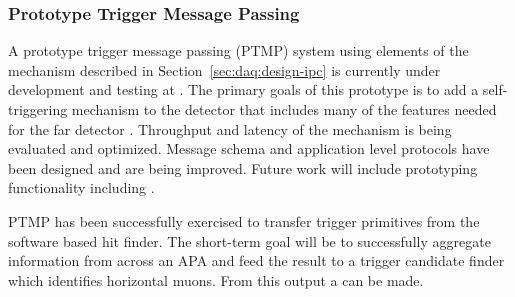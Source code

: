 \subsubsection{Prototype Trigger Message Passing}

A prototype trigger message passing (PTMP) system using elements of the  mechanism described in Section~\ref{sec:daq:design-ipc} is currently under development and testing at .
The primary goals of this prototype is to add a self-triggering mechanism to the  detector that includes many of the features needed for the far detector .
Throughput and latency of the mechanism is being evaluated and optimized.
Message schema and application level protocols have been designed and are being improved.
Future work will include prototyping  functionality including .

PTMP has been successfully exercised to transfer trigger primitives from the software based hit finder. The short-term goal will be to successfully aggregate information from across an APA and feed the result to a trigger candidate finder which identifies horizontal muons. From this output a  can be made.




